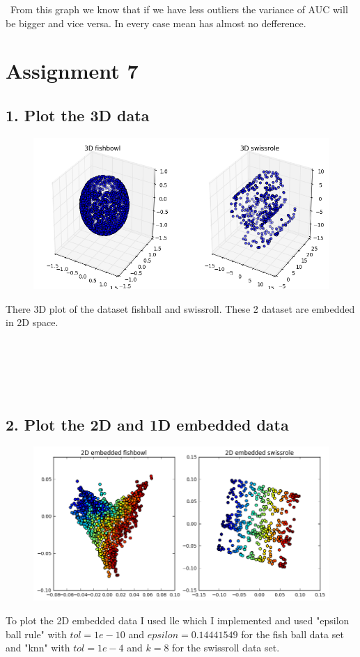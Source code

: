 \documentclass[a4paper,11pt]{article}
\begin{document}
\ From this graph we know that if we have less outliers the variance of AUC will be bigger and vice versa. In every case mean has almost no defference.



\section*{Assignment 7}
\subsection*{1. Plot the 3D data}
\begin{figure}[htbp]
  \includegraphics[scale=0.5]{3d.png}
\end{figure}
There 3D plot of the dataset fishball and swissroll. These 2 dataset are embedded in 2D space.
\begin{verbatim}





\end{verbatim}
\subsection*{2. Plot the 2D and 1D embedded data}
\begin{figure}[htbp]
  \includegraphics[scale=0.5]{2d.png}
\end{figure}
To plot the 2D embedded data I used lle which I implemented and used "epsilon ball rule" with $tol=1e-10$ and $epsilon=0.14441549$ for the fish ball data set and "knn" with $tol=1e-4$ and $k=8$ for the swissroll data set.
 
\end{document}
